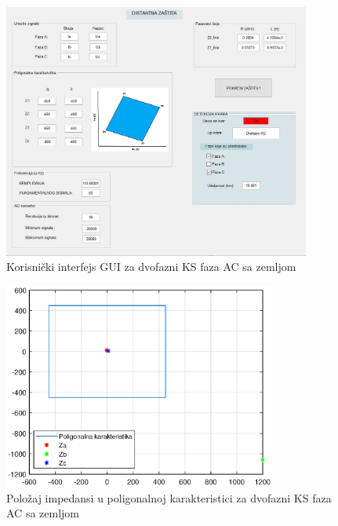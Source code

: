 \begin{figure}[H]
  \centering
  \includegraphics[width=0.9\textwidth]{Rezultati1/gui_2F_AC_G.jpg}
  \caption{Korisnički interfejs GUI za dvofazni KS faza AC sa zemljom}
  \label{fig:61}
\end{figure}


\begin{figure}[H]
  \centering
  \includegraphics[width=0.8\textwidth]{Rezultati1/karakteristika_2F_AC_G.eps}
  \caption{Položaj impedansi u poligonalnoj karakteristici za dvofazni KS faza AC sa zemljom}
  \label{fig:62}
\end{figure}


